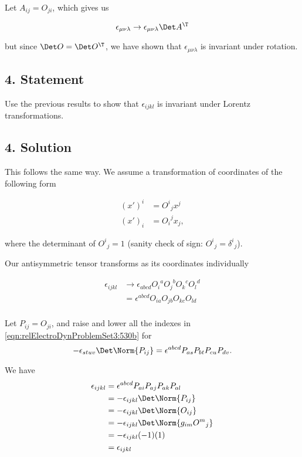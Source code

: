 Let $A_{i j} = O_{j i}$, which gives us

\begin{equation}\label{eqn:relElectroDynProblemSet3:720}
\epsilon_{\mu\nu\lambda} \rightarrow \epsilon_{\mu\nu\lambda} \Det A^\T
\end{equation}

but since $\Det O = \Det O^\T$, we have shown that $\epsilon_{\mu\nu\lambda}$ is invariant under rotation.

\subsection{4. Statement}

Use the previous results to show that $\epsilon_{i j k l}$ is invariant under Lorentz transformations.

\subsection{4. Solution}

This follows the same way.  We assume a transformation of coordinates of the following form

\begin{align}\label{eqn:relElectroDynProblemSet3:740}
(x')^i &= {O^i}_j x^j \\
(x')_i &= {O_i}^j x_j,
\end{align}

where the determinant of ${O^i}_j = 1$ (sanity check of sign: ${O^i}_j = {\delta^i}_j$).

Our antisymmetric tensor transforms as its coordinates individually

\begin{align*}
\epsilon_{i j k l} 
&\rightarrow \epsilon_{a b c d} 
{O_i}^a
{O_j}^b
{O_k}^c
{O_l}^d \\
&= \epsilon^{a b c d} 
O_{i a}
O_{j b}
O_{k c}
O_{l d} \\
\end{align*}

Let $P_{ij} = O_{ji}$, and raise and lower all the indexes in \ref{eqn:relElectroDynProblemSet3:530b} for
\begin{equation}\label{eqn:relElectroDynProblemSet3:530b}
-\epsilon_{s t u v} \Det \Norm{P_{ij}}
=
\epsilon^{a b c d} P_{a s} P_{b t} P_{c u} P_{d v}.
\end{equation}

We have
\begin{align*}
\epsilon_{i j k l} 
&= \epsilon^{a b c d} 
P_{a i}
P_{a j}
P_{a k}
P_{a l} \\
&=
-\epsilon_{i j k l} \Det \Norm{P_{ij}} \\
&=
-\epsilon_{i j k l} \Det \Norm{O_{ij}} \\
&=
-\epsilon_{i j k l} \Det \Norm{g_{im} {O^m}_j } \\
&=
-\epsilon_{i j k l} (-1)(1) \\
&=
\epsilon_{i j k l}
\end{align*}

